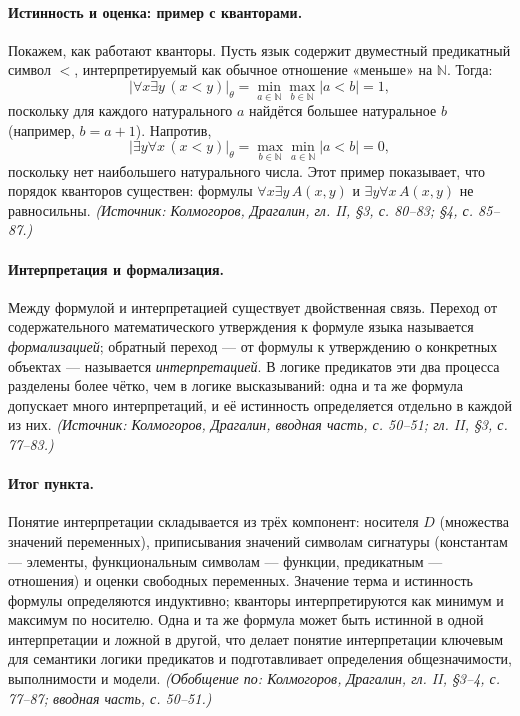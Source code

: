 \documentclass[a4paper,12pt]{article}
\begin{document}
\paragraph{Истинность и оценка: пример с кванторами.} Покажем, как работают кванторы. Пусть язык содержит двуместный предикатный символ \(<\), интерпретируемый как обычное отношение «меньше» на \(\mathbb{N}\). Тогда:
\[
|\forall x\exists y\,(x<y)|_\theta
=\min_{a\in\mathbb{N}}\max_{b\in\mathbb{N}}|a<b|=1,
\]
поскольку для каждого натурального \(a\) найдётся большее натуральное \(b\) (например, \(b=a+1\)). Напротив,
\[
|\exists y\forall x\,(x<y)|_\theta
=\max_{b\in\mathbb{N}}\min_{a\in\mathbb{N}}|a<b|=0,
\]
поскольку нет наибольшего натурального числа. Этот пример показывает, что порядок кванторов существен: формулы \(\forall x\exists y\,A(x,y)\) и \(\exists y\forall x\,A(x,y)\) не равносильны.
\textit{(Источник: Колмогоров, Драгалин, гл. II, §3, с. 80--83; §4, с. 85--87.)}

\paragraph{Интерпретация и формализация.} Между формулой и интерпретацией существует двойственная связь. Переход от содержательного математического утверждения к формуле языка называется \emph{формализацией}; обратный переход --- от формулы к утверждению о конкретных объектах --- называется \emph{интерпретацией}. В логике предикатов эти два процесса разделены более чётко, чем в логике высказываний: одна и та же формула допускает много интерпретаций, и её истинность определяется отдельно в каждой из них.
\textit{(Источник: Колмогоров, Драгалин, вводная часть, с. 50--51; гл. II, §3, с. 77--83.)}

\paragraph{Итог пункта.} Понятие интерпретации складывается из трёх компонент: носителя \(D\) (множества значений переменных), приписывания значений символам сигнатуры (константам --- элементы, функциональным символам --- функции, предикатным --- отношения) и оценки свободных переменных. Значение терма и истинность формулы определяются индуктивно; кванторы интерпретируются как минимум и максимум по носителю. Одна и та же формула может быть истинной в одной интерпретации и ложной в другой, что делает понятие интерпретации ключевым для семантики логики предикатов и подготавливает определения общезначимости, выполнимости и модели.
\textit{(Обобщение по: Колмогоров, Драгалин, гл. II, §3--4, с. 77--87; вводная часть, с. 50--51.)}
\end{document}
